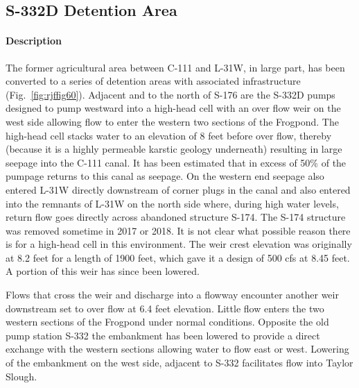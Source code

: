 \clearpage

\subsection{S-332D Detention Area}
\paragraph{Description}

The former agricultural area between C-111 and L-31W, in large part, has been converted to a series of detention areas with associated infrastructure (Fig.~\ref{fig:rjffig60}). Adjacent and to the north of S-176 are the S-332D pumps designed to pump westward into a high-head cell with an over flow weir on the west side allowing flow to enter the western two sections of the Frogpond. The high-head cell stacks water to an elevation of 8 feet before over flow, thereby (because it is a highly permeable karstic geology underneath) resulting in large seepage into the C-111 canal. It has been estimated that in excess of 50\% of the pumpage returns to this canal as seepage.
On the western end seepage also entered L-31W directly downstream of corner plugs in the canal and also entered into the remnants of L-31W on the north side where, during high water levels, return flow goes directly across abandoned structure S-174. The S-174 structure was removed sometime in 2017 or 2018.
It is not clear what possible reason there is for a high-head cell in this environment.
The weir crest elevation was originally at 8.2 feet for a length of 1900 feet, which gave it a design of 500 cfs at 8.45 feet. A portion of this weir has since been lowered.

Flows that cross the weir and discharge into a flowway encounter another weir downstream set to over flow at 6.4 feet elevation.
Little flow enters the two western sections of the Frogpond under normal conditions.
Opposite the old pump station S-332 the embankment has been lowered to provide a direct exchange with the western sections allowing water to  flow east or west.
Lowering of the embankment on the west side, adjacent to S-332 facilitates  flow into Taylor Slough.


